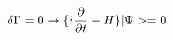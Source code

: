 \begin{equation}
 \delta\Gamma = 0 \rightarrow
\{ i {\partial \over \partial t} - H \} |\Psi > = 0
\end{equation}

